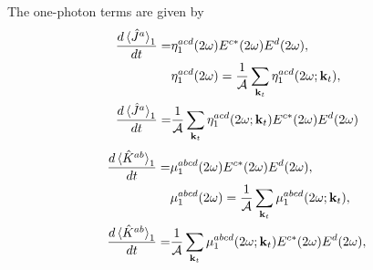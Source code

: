 \documentclass{article}
\newcommand{\kt}{\mathbf{k}_{t}}
\begin{document}
The one-photon terms are given by
\begin{align}
\frac{d\ev*{\hat{J}^{a}}_{1}}{dt} =& \eta^{acd}_{1}(2\omega) E^{c*}(2\omega)
E^{d}(2\omega), \nonumber \\ 
& \eta^{acd}_{1}(2\omega) = \frac{1}{\mathcal{A}} \sum_{\kt} \eta^{acd}_{1}
(2\omega;\kt), \nonumber \\
\frac{d\ev*{\hat{J}^{a}}_{1}}{dt} =& \frac{1}{\mathcal{A}} \sum_{\kt} 
\eta^{acd}_{1} (2\omega;\kt) E^{c*}(2\omega) E^{d}(2\omega) \label{eq:J_1-2w}
\end{align}
\begin{align}
\frac{d\ev*{\hat{K}^{ab}}_{1}}{dt} =& \mu^{abcd}_{1}(2\omega)
E^{c*}(2\omega) E^{d}(2\omega), \nonumber \\ 
& \mu^{abcd}_{1}(2\omega) = \frac{1}{\mathcal{A}} \sum_{\kt} \mu^{abcd}_{1}
(2\omega;\kt) , \nonumber \\
\frac{d\ev*{\hat{K}^{ab}}_{1}}{dt} =& \frac{1}{\mathcal{A}} \sum_{\kt} 
\mu^{abcd}_{1}(2\omega;\kt) E^{c*}(2\omega) E^{d}(2\omega), \label{eq:mu_1-2w}
\end{align}
\end{document}
